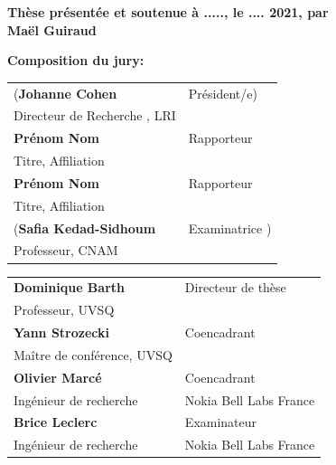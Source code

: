 \begin{titlepage}
\textbf{Thèse présentée et soutenue à ....., le .... 2021, par}\\
\bigskip
\Large {\color{Prune} \textbf{Maël Guiraud}}


\vspace{\fill} %

\flushleft \small \textbf{Composition du jury:}
\bigskip



\scriptsize
\begin{tabular}{|p{8cm}l}
\arrayrulecolor{Prune}
(\textbf{Johanne Cohen} &   Président/e)\\ 
Directeur de Recherche , LRI & \\
\textbf{Prénom Nom} &  Rapporteur \\ 
Titre, Affiliation   &   \\ 
\textbf{Prénom Nom} &  Rapporteur \\ 
Titre, Affiliation  &   \\ 
(\textbf{Safia Kedad-Sidhoum} &  Examinatrice )\\ 
Professeur, CNAM   &   \\ 



\end{tabular} 

\medskip
\begin{tabular}{|p{8cm}l}\arrayrulecolor{white}
\textbf{Dominique Barth} &   Directeur de thèse\\ 
Professeur, UVSQ & \\
\textbf{Yann Strozecki} &   Coencadrant\\ 
Maître de conférence, UVSQ  &   \\ 
\textbf{Olivier Marcé} &  Coencadrant \\ 
Ingénieur de recherche  & Nokia Bell Labs France  \\ 
\textbf{Brice Leclerc} &  Examinateur \\ 
Ingénieur de recherche  & Nokia Bell Labs France  \\ 

\end{tabular} 


\end{titlepage}
\ifthispageodd{\newpage\thispagestyle{empty}\null\newpage}{}
\thispagestyle{empty}
\selectfont

